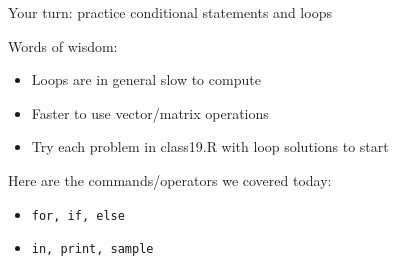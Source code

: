 \documentclass[ignorenonframetext,]{beamer}
\providecommand{\tightlist}{%
	\setlength{\itemsep}{0pt}\setlength{\parskip}{0pt}}
\begin{document}
\begin{frame}[fragile]{Your turn: practice conditional statements and
loops}

Words of wisdom:
\begin{itemize}
	\item Loops are in general slow to compute
	\item Faster to use vector/matrix operations
	\item Try each problem in class19.R with loop solutions to start
\end{itemize} 

Here are the commands/operators we covered today:

\begin{itemize}
\tightlist
\item
  \texttt{for,\ if,\ else}
\item
  \texttt{in,\ print,\ sample}
\end{itemize}

\end{frame}
\end{document}
